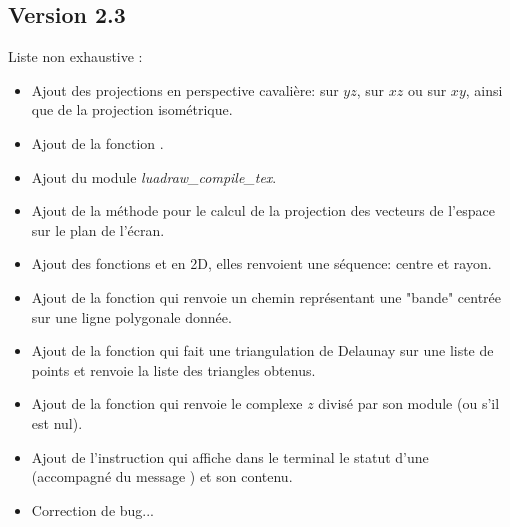 \subsection{Version 2.3}
Liste non exhaustive :
\begin{itemize}
\item Ajout des projections en perspective cavalière: sur $yz$, sur $xz$ ou sur $xy$, ainsi que de la projection isométrique.
\item Ajout de la fonction .
\item Ajout du module \emph{luadraw\_compile\_tex}.
\item Ajout de la méthode  pour le calcul de la projection des vecteurs de l'espace sur le plan de l'écran.
\item Ajout des fonctions  et  en 2D, elles renvoient une séquence: centre et rayon.
\item Ajout de la fonction  qui renvoie un chemin représentant une "bande" centrée sur une ligne polygonale donnée.
\item Ajout de la fonction  qui fait une triangulation de Delaunay sur une liste de points et renvoie la liste des triangles obtenus.
\item Ajout de la fonction  qui renvoie le complexe $z$ divisé par son module (ou \nil s'il est nul).
\item Ajout de l'instruction  qui affiche dans le terminal le statut d'une  (accompagné du message ) et son contenu.
\item Correction de bug...    
\end{itemize}


